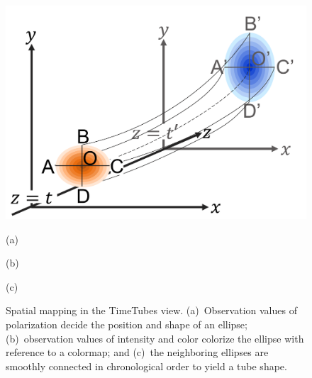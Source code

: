 \begin{figure}[tb]
\begin{minipage}{0.26\linewidth}
    \end{minipage}
    \begin{minipage}{0.36\linewidth}
        \centering
        \includegraphics[width=.99\linewidth]{figures/howtotube.pdf}
    \end{minipage}
    \begin{minipage}{0.34\linewidth}
        \centering
        \footnotesize{\sf (a)}
        \end{minipage}
    \begin{minipage}{0.26\linewidth}
        \centering
        \footnotesize{\sf (b)}
    \end{minipage}
    \begin{minipage}{0.36\linewidth}
        \centering
        \footnotesize{\sf (c)}
    \end{minipage}
    \caption{Spatial mapping in the TimeTubes view. 
    (a)~Observation values of polarization decide the position and shape of an ellipse;
    (b)~observation values of intensity and color colorize the ellipse with reference to a colormap; and
    (c)~the neighboring ellipses are smoothly connected in chronological order to yield a tube shape.}
    \label{fig:howtoplot}
\end{figure}
